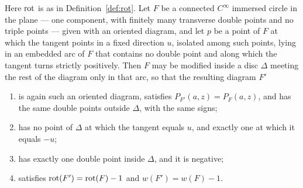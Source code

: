\begin{lemma}\label{lem:curl}
Here $\operatorname{rot}$ is as in Definition~\ref{def:rot}.
Let $F$ be a connected $C^\infty$ immersed circle in the plane --- one
component, with finitely many transverse double points and no triple points ---
given with an oriented diagram, and let $p$ be a point of $F$ at which the
tangent points in a fixed direction $u$, isolated among such points, lying in
an embedded arc of $F$ that contains no double point and along which the tangent
turns strictly positively. Then $F$ may be modified inside a disc $\Delta$
meeting the rest of the diagram only in that arc, so that the resulting
diagram $F'$
\begin{enumerate}
\item[(i)] is again such an oriented diagram, satisfies
$P_{F'}(a,z)=P_F(a,z)$, and has the same double points outside $\Delta$, with
the same signs;
\item[(ii)] has no point of $\Delta$ at which the tangent equals $u$, and exactly
one at which it equals $-u$;
\item[(iii)] has exactly one double point inside $\Delta$, and it is negative;
\item[(iv)] satisfies $\operatorname{rot}(F')=\operatorname{rot}(F)-1$ and $w(F')=w(F)-1$.
\end{enumerate}
\end{lemma}
